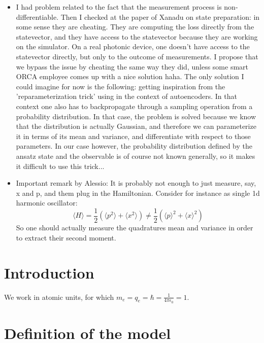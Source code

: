 \documentclass[reprint, amsmath, amssymb, aps]{revtex4-2}
\begin{document}
{\begin{itemize}
        \item I had problem related to the fact that the measurement process is non-differentiable. Then I checked at the paper of Xanadu on state preparation: in some sense they are cheating. They are computing the loss directly from the statevector, and they have access to the statevector because they are working on the simulator. On a real photonic device, one doesn't have access to the statevector directly, but only to the outcome of measurements. I propose that we bypass the issue by cheating the same way they did, unless some smart ORCA employee comes up with a nice solution haha. The only solution I could imagine for now is the following: getting inspiration from the 'reparameterization trick' using in the context of autoencoders. In that context one also has to backpropagate through a sampling operation from a probability distribution. In that case, the problem is solved because we know that the distribution is actually Gaussian, and therefore we can parameterize it in terms of its mean and variance, and differentiate with respect to those parameters. In our case however, the probability distribution defined by the ansatz state and the observable is of course not known generally, so it makes it difficult to use this trick...
        \item Important remark by Alessio: It is probably not enough to just measure, say, x and p, and them plug in the Hamiltonian. Consider for instance as single 1d harmonic oscillator:
        \[
            \langle H\rangle = \frac{1}{2}(\langle p^2\rangle+\langle x^2\rangle) \neq \frac{1}{2}(\langle p\rangle^2+\langle x\rangle^2)
        \]
        So one should actually measure the quadratures mean and variance in order to extract their second moment.
    \end{itemize}
}

\section{Introduction}

    We work in atomic units, for which $m_e=q_e=\hbar=\frac{1}{4\pi\epsilon_0}=1$.

\section{Definition of the model}
\end{document}
